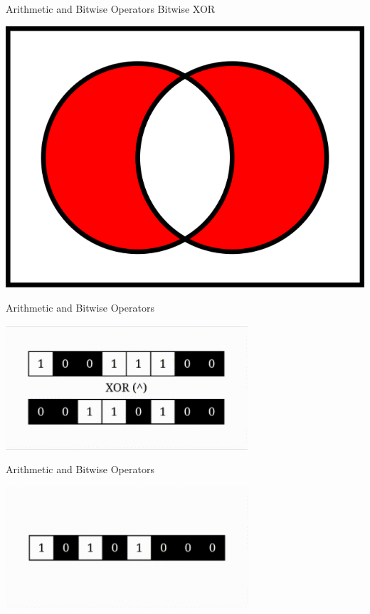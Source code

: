 \documentclass{beamer}
\begin{document}
    \begin{frame}{Arithmetic and Bitwise Operators}
        \color{blue} \Large Bitwise  XOR\\
        \color{black} \normalsize \vskip 10pt
        \begin{center}
            \includegraphics[scale = 0.2]{XOR.png}
        \end{center}
    \end{frame}
    
    \begin{frame}{Arithmetic and Bitwise Operators}
        \begin{center}
            \includegraphics[scale = 0.8]{XOR Before.png}
        \end{center}
    \end{frame}
    
    \begin{frame}{Arithmetic and Bitwise Operators}
        \begin{center}
            \includegraphics[scale = 0.8]{XOR After.png}
        \end{center}
    \end{frame}
\end{document}
